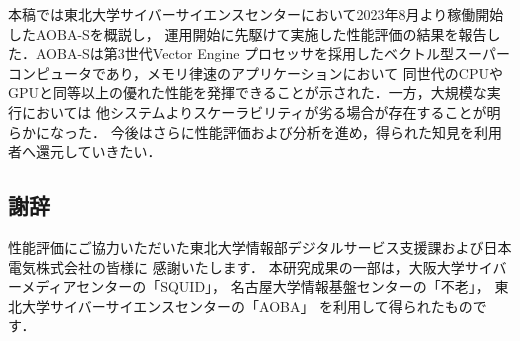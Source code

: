 ﻿\documentclass[submit,techrep,noauthor]{ipsj}
\begin{document}
本稿では東北大学サイバーサイエンスセンターにおいて2023年8月より稼働開始したAOBA-Sを概説し，
運用開始に先駆けて実施した性能評価の結果を報告した．AOBA-Sは第3世代Vector Engine
プロセッサを採用したベクトル型スーパーコンピュータであり，メモリ律速のアプリケーションにおいて
同世代のCPUやGPUと同等以上の優れた性能を発揮できることが示された．一方，大規模な実行においては
他システムよりスケーラビリティが劣る場合が存在することが明らかになった．
今後はさらに性能評価および分析を進め，得られた知見を利用者へ還元していきたい．

\subsection*{謝辞}

性能評価にご協力いただいた東北大学情報部デジタルサービス支援課および日本電気株式会社の皆様に
感謝いたします．
本研究成果の一部は，大阪大学サイバーメディアセンターの「SQUID」，
名古屋大学情報基盤センターの「不老」，
東北大学サイバーサイエンスセンターの「AOBA」
を利用して得られたものです．



\end{document}
